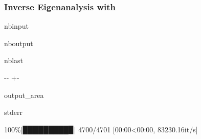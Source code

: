\documentclass[letterpaper,10pt,english]{sphinxmanual}
\let\sphinxpxdimen\pdfpxdimen\else\newdimen\sphinxpxdimen
\begin{document}
\subsubsection{Inverse Eigenanalysis with }
\label{\detokenize{examples/00_Overview:Inverse-Eigenanalysis-with-mdof.eigid()}}




\sphinxAtStartPar
\sphinxincludegraphics[width=550\sphinxpxdimen]{{eigid}.png}





\begin{sphinxuseclass}{nbinput}
{
\begin{sphinxVerbatim}[commandchars=\\\{\}]
\llap{\color{nbsphinxin}[4]:\,\hspace{\fboxrule}\hspace{\fboxsep}}     
\end{sphinxVerbatim}
}

\end{sphinxuseclass}
\begin{sphinxuseclass}{nboutput}
\begin{sphinxuseclass}{nblast}
{

\kern-\sphinxverbatimsmallskipamount\kern-\baselineskip
\kern+\FrameHeightAdjust\kern-\fboxrule
\vspace{\nbsphinxcodecellspacing}

\begin{sphinxuseclass}{output_area}
\begin{sphinxuseclass}{stderr}


\begin{sphinxVerbatim}[commandchars=\\\{\}]
100\%|█████████▉| 4700/4701 [00:00<00:00, 83230.16it/s]
\end{sphinxVerbatim}



\end{sphinxuseclass}
\end{sphinxuseclass}
}

\end{sphinxuseclass}
\end{sphinxuseclass}
\end{document}
